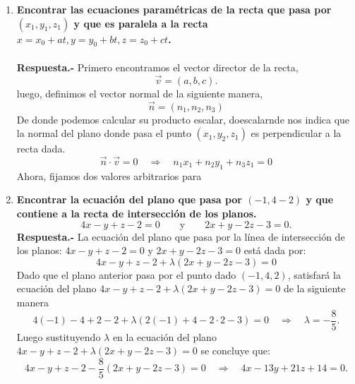 \begin{enumerate}
    \item \textbf{\boldmath Encontrar las ecuaciones paramétricas de la recta que pasa por $(x_1, y_1, z_1)$ y que es paralela a la recta $x = x_0 + at, y = y_0 + bt, z = z_0 + ct$.\\\\
	    Respuesta.-}\; Primero encontramos el vector director de la recta,
	    $$\vec{v}=(a,b,c).$$
	    luego, definimos el vector normal de la siguiente manera,
	    $$\vec{n}=(n_1,n_2,n_3)$$
	    De donde podemos calcular su producto escalar, doescalarnde nos indica que la normal del plano donde pasa el punto $(x_1,y_2,z_1)$ es perpendicular a la recta dada.
	    $$\vec{n}\cdot \vec{v}=0 \quad \Rightarrow \quad n_1x_1+n_2y_1+n_3z_1=0$$
	    Ahora, fijamos dos valores arbitrarios para 
	


    \item \textbf{\boldmath Encontrar la ecuación del plano que pasa por $(-1,4-2)$ y que contiene a la recta de intersección de los planos.
    $$4x-y+z-2=0\qquad \mbox{y}\qquad 2x+y-2z-3=0.$$
	Respuesta.-}\; La ecuación del plano que pasa por la línea de intersección de los planos: $4x-y+z-2=0$ y $2x+y-2z-3=0$ está dada por:
	$$4x-y+z-2+\lambda(2x+y-2z-3)=0$$
	Dado que el plano anterior pasa por el punto dado $(-1,4,2)$, satisfará la ecuación del plano $4x-y+z-2+\lambda(2x+y-2z-3)=0$ de la siguiente manera
	$$4(-1)-4+2-2+\lambda(2(-1)+4-2\cdot 2-3)=0 \quad \Rightarrow \quad \lambda =-\dfrac{8}{5}.$$
	Luego sustituyendo $\lambda$ en la ecuación del plano $4x-y+z-2+\lambda(2x+y-2z-3)=0$ se concluye que:
	$$4x-y+z-2-\dfrac{8}{5}(2x+y-2z-3)=0 \quad \Rightarrow \quad 4x-13y+21z+14=0.$$\\


\end{enumerate}
